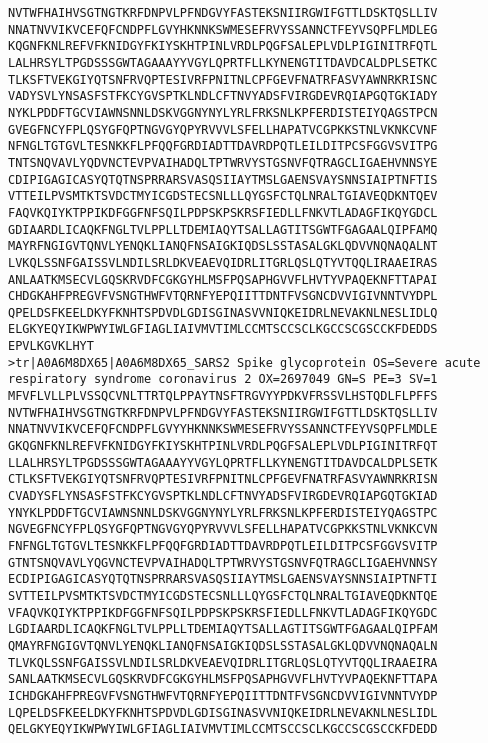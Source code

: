 \begin{lstlisting}
NVTWFHAIHVSGTNGTKRFDNPVLPFNDGVYFASTEKSNIIRGWIFGTTLDSKTQSLLIV
NNATNVVIKVCEFQFCNDPFLGVYHKNNKSWMESEFRVYSSANNCTFEYVSQPFLMDLEG
KQGNFKNLREFVFKNIDGYFKIYSKHTPINLVRDLPQGFSALEPLVDLPIGINITRFQTL
LALHRSYLTPGDSSSGWTAGAAAYYVGYLQPRTFLLKYNENGTITDAVDCALDPLSETKC
TLKSFTVEKGIYQTSNFRVQPTESIVRFPNITNLCPFGEVFNATRFASVYAWNRKRISNC
VADYSVLYNSASFSTFKCYGVSPTKLNDLCFTNVYADSFVIRGDEVRQIAPGQTGKIADY
NYKLPDDFTGCVIAWNSNNLDSKVGGNYNYLYRLFRKSNLKPFERDISTEIYQAGSTPCN
GVEGFNCYFPLQSYGFQPTNGVGYQPYRVVVLSFELLHAPATVCGPKKSTNLVKNKCVNF
NFNGLTGTGVLTESNKKFLPFQQFGRDIADTTDAVRDPQTLEILDITPCSFGGVSVITPG
TNTSNQVAVLYQDVNCTEVPVAIHADQLTPTWRVYSTGSNVFQTRAGCLIGAEHVNNSYE
CDIPIGAGICASYQTQTNSPRRARSVASQSIIAYTMSLGAENSVAYSNNSIAIPTNFTIS
VTTEILPVSMTKTSVDCTMYICGDSTECSNLLLQYGSFCTQLNRALTGIAVEQDKNTQEV
FAQVKQIYKTPPIKDFGGFNFSQILPDPSKPSKRSFIEDLLFNKVTLADAGFIKQYGDCL
GDIAARDLICAQKFNGLTVLPPLLTDEMIAQYTSALLAGTITSGWTFGAGAALQIPFAMQ
MAYRFNGIGVTQNVLYENQKLIANQFNSAIGKIQDSLSSTASALGKLQDVVNQNAQALNT
LVKQLSSNFGAISSVLNDILSRLDKVEAEVQIDRLITGRLQSLQTYVTQQLIRAAEIRAS
ANLAATKMSECVLGQSKRVDFCGKGYHLMSFPQSAPHGVVFLHVTYVPAQEKNFTTAPAI
CHDGKAHFPREGVFVSNGTHWFVTQRNFYEPQIITTDNTFVSGNCDVVIGIVNNTVYDPL
QPELDSFKEELDKYFKNHTSPDVDLGDISGINASVVNIQKEIDRLNEVAKNLNESLIDLQ
ELGKYEQYIKWPWYIWLGFIAGLIAIVMVTIMLCCMTSCCSCLKGCCSCGSCCKFDEDDS
EPVLKGVKLHYT
>tr|A0A6M8DX65|A0A6M8DX65_SARS2 Spike glycoprotein OS=Severe acute respiratory syndrome coronavirus 2 OX=2697049 GN=S PE=3 SV=1
MFVFLVLLPLVSSQCVNLTTRTQLPPAYTNSFTRGVYYPDKVFRSSVLHSTQDLFLPFFS
NVTWFHAIHVSGTNGTKRFDNPVLPFNDGVYFASTEKSNIIRGWIFGTTLDSKTQSLLIV
NNATNVVIKVCEFQFCNDPFLGVYYHKNNKSWMESEFRVYSSANNCTFEYVSQPFLMDLE
GKQGNFKNLREFVFKNIDGYFKIYSKHTPINLVRDLPQGFSALEPLVDLPIGINITRFQT
LLALHRSYLTPGDSSSGWTAGAAAYYVGYLQPRTFLLKYNENGTITDAVDCALDPLSETK
CTLKSFTVEKGIYQTSNFRVQPTESIVRFPNITNLCPFGEVFNATRFASVYAWNRKRISN
CVADYSFLYNSASFSTFKCYGVSPTKLNDLCFTNVYADSFVIRGDEVRQIAPGQTGKIAD
YNYKLPDDFTGCVIAWNSNNLDSKVGGNYNYLYRLFRKSNLKPFERDISTEIYQAGSTPC
NGVEGFNCYFPLQSYGFQPTNGVGYQPYRVVVLSFELLHAPATVCGPKKSTNLVKNKCVN
FNFNGLTGTGVLTESNKKFLPFQQFGRDIADTTDAVRDPQTLEILDITPCSFGGVSVITP
GTNTSNQVAVLYQGVNCTEVPVAIHADQLTPTWRVYSTGSNVFQTRAGCLIGAEHVNNSY
ECDIPIGAGICASYQTQTNSPRRARSVASQSIIAYTMSLGAENSVAYSNNSIAIPTNFTI
SVTTEILPVSMTKTSVDCTMYICGDSTECSNLLLQYGSFCTQLNRALTGIAVEQDKNTQE
VFAQVKQIYKTPPIKDFGGFNFSQILPDPSKPSKRSFIEDLLFNKVTLADAGFIKQYGDC
LGDIAARDLICAQKFNGLTVLPPLLTDEMIAQYTSALLAGTITSGWTFGAGAALQIPFAM
QMAYRFNGIGVTQNVLYENQKLIANQFNSAIGKIQDSLSSTASALGKLQDVVNQNAQALN
TLVKQLSSNFGAISSVLNDILSRLDKVEAEVQIDRLITGRLQSLQTYVTQQLIRAAEIRA
SANLAATKMSECVLGQSKRVDFCGKGYHLMSFPQSAPHGVVFLHVTYVPAQEKNFTTAPA
ICHDGKAHFPREGVFVSNGTHWFVTQRNFYEPQIITTDNTFVSGNCDVVIGIVNNTVYDP
LQPELDSFKEELDKYFKNHTSPDVDLGDISGINASVVNIQKEIDRLNEVAKNLNESLIDL
QELGKYEQYIKWPWYIWLGFIAGLIAIVMVTIMLCCMTSCCSCLKGCCSCGSCCKFDEDD

\end{lstlisting}

